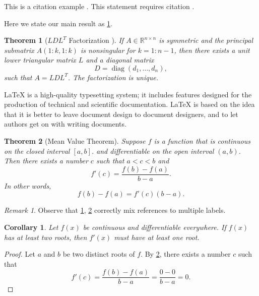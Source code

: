 \documentclass[10pt,reqno,final]{article}
\theoremstyle{plain}
\newtheorem{theorem}{Theorem}[section]
\newtheorem{corollary}{Corollary}[section]
\theoremstyle{definition}
\theoremstyle{remark}
\newtheorem{remark}{Remark}[section]
\numberwithin{equation}{section}
\numberwithin{figure}{section}
\numberwithin{table}{section}
\begin{document}
This is a citation example \cite{Adams2003}. This statement requires citation \cite{Shen1994,Tadmor2012,TreWei2014}.

Here we state our main result as \ref{thm:bigthm}.

\begin{theorem}[$LDL^T$ Factorization \cite{GoVa2013}]\label{thm:bigthm}
  If $A \in \mathbb{R}^{n \times n}$ is symmetric and the principal
  submatrix $A(1:k,1:k)$ is nonsingular for $k=1:n-1$, then there
  exists a unit lower triangular matrix $L$ and a diagonal matrix
  \begin{equation*}
    D = \operatorname{diag}(d_1,\dots,d_n),  %
  \end{equation*}
  such that $A=LDL^T$. The factorization is unique.
\end{theorem}

LaTeX is a high-quality typesetting system; it includes features designed for the production of technical and scientific documentation.
LaTeX is based on the idea that it is better to leave document design to document designers, and to let authors get on with writing documents.

\begin{theorem}[Mean Value Theorem]\label{thm:mvt}
  Suppose $f$ is a function that is continuous on the closed interval
  $[a,b]$.  and differentiable on the open interval $(a,b)$.
  Then there exists a number $c$ such that $a < c < b$ and
  \begin{equation*}
    f'(c) = \frac{f(b)-f(a)}{b-a}.
  \end{equation*}
  In other words,
  \begin{equation*}
    f(b)-f(a) = f'(c)(b-a).
  \end{equation*}
\end{theorem}

\begin{remark}
Observe that \ref{thm:bigthm}, \ref{thm:mvt} correctly mix references
to multiple labels.
\end{remark}


\begin{corollary}\label{cor:a}
  Let $f(x)$ be continuous and differentiable everywhere. If $f(x)$
  has at least two roots, then $f'(x)$ must have at least one root.
\end{corollary}
\begin{proof}
  Let $a$ and $b$ be two distinct roots of $f$.
  By \ref{thm:mvt}, there exists a number $c$ such that
  \begin{equation*}
    f'(c) = \frac{f(b)-f(a)}{b-a} = \frac{0-0}{b-a} = 0.
  \end{equation*}
\end{proof}
\end{document}
